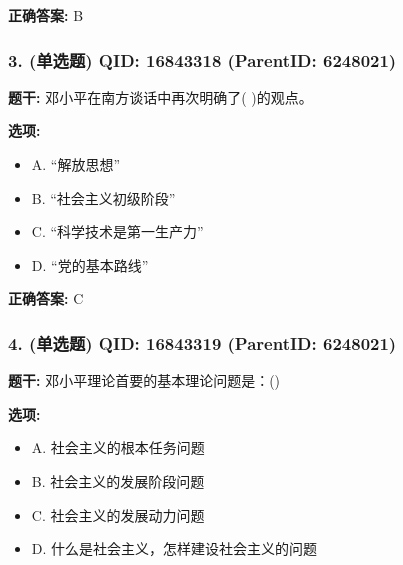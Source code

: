 \documentclass[12pt,UTF8]{ctexart}
\begin{document}
\textbf{正确答案:}
B

\vspace{0.3em}\hrulefill\vspace{0.7em}

\subsubsection*{3. (单选题) \small QID: 16843318 (ParentID: 6248021)}

\textbf{题干:}
邓小平在南方谈话中再次明确了( )的观点。



\textbf{选项:}
\begin{itemize}[leftmargin=*]

  \item A. “解放思想”

  \item B. “社会主义初级阶段”

  \item C. “科学技术是第一生产力”

  \item D. “党的基本路线”

\end{itemize}

\textbf{正确答案:}
C

\vspace{0.3em}\hrulefill\vspace{0.7em}

\subsubsection*{4. (单选题) \small QID: 16843319 (ParentID: 6248021)}

\textbf{题干:}
邓小平理论首要的基本理论问题是：()



\textbf{选项:}
\begin{itemize}[leftmargin=*]

  \item A. 社会主义的根本任务问题

  \item B. 社会主义的发展阶段问题

  \item C. 社会主义的发展动力问题

  \item D. 什么是社会主义，怎样建设社会主义的问题

\end{itemize}
\end{document}

